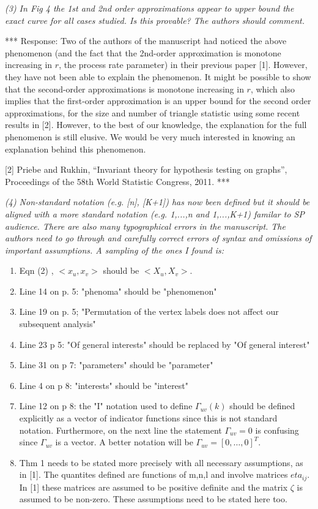 \documentclass{article}
\begin{document}
{\em (3) In Fig 4 the 1st and 2nd order approximations appear to upper bound
the exact curve for all cases studied.  Is this provable? The authors
should comment.}

*** Response: Two of the authors of the manuscript had noticed the
above phenomenon (and the fact that the 2nd-order approximation is
monotone increasing in $r$, the process rate parameter) in their
previous paper [1]. However, they have not been able to explain the
phenomenon. It might be possible to show that the second-order
approximations is monotone increasing in $r$, which also implies that
the first-order approximation is an upper bound for the second order
approximations, for the size and number of triangle statistic using
some recent results in [2]. However, to the best of our knowledge, the
explanation for the full phenomenon is still elusive. We would be very
much interested in knowing an explanation behind this phenomenon.

[2] Priebe and Rukhin, ``Invariant theory for hypothesis testing on
graphs'', Proceedings of the 58th World Statistic Congress, 2011. 
***

{\em (4) Non-standard notation (e.g. [n], [K+1]) has now been defined but
it should be aligned with a more standard notation (e.g. {1,...,n} and
{1,...,K+1}) familar to SP audience. There are also many typographical
errors in the manuscript. The authors need to go through and carefully
correct errors of syntax and omissions of important assumptions. A
sampling of the ones I found is:

\begin{enumerate}
  \item Eqn (2) , $<x_u,x_v>$ should be $<X_u,X_v>$.
  \item Line 14 on p. 5: "phenoma" should be "phenomenon"
  \item Line 19 on p. 5; "Permutation of the vertex labels does not affect
our subsequent analysis"
\item Line 23 p 5: "Of general interests" should be replaced by "Of general interest"
\item Line 31 on p 7: "parameters" should be "parameter"
\item Line 4 on p 8: "interests" should be "interest"
\item Line 12 on p 8: the "I" notation used to define $\Gamma_{uv}(k)$ should
be defined explicitly as a vector of indicator functions since this is
not standard notation. Furthermore, on the next line the statement
$\Gamma_{uv}=0$ is confusing since $\Gamma_{uv}$ is a vector. A better
notation will be $\Gamma_{uv} =[0,\ldots,0]^T$.
\item Thm 1 needs to be stated more precisely with all necessary
assumptions, as in [1]. The quantites defined are functions of m,n,l
and involve matrices $eta_{ij}$. In [1] these matrices are assumed to be
positive definite and the matrix $\zeta$ is assumed to be
non-zero. These assumptions need to be stated here too.
\end{enumerate}}
\end{document}
